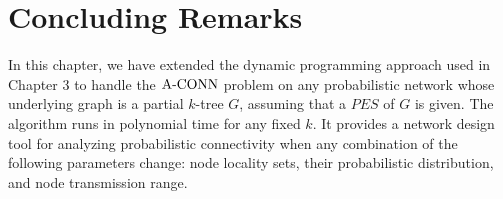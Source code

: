 \section{Concluding Remarks}
In this chapter, we have extended the dynamic programming approach used in Chapter 3 to handle the ${\mathrm {A\mbox{-}CONN}}$ problem on any probabilistic network whose underlying graph is a partial $k$-tree $G$, assuming that a $PES$ of $G$ is given. The algorithm runs in polynomial time for any fixed $k$. It provides a network design tool for analyzing probabilistic connectivity when any combination of the following parameters change: node locality sets, their probabilistic distribution, and node transmission range.    
